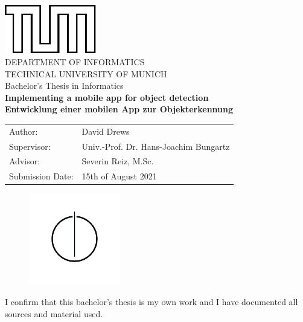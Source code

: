 \documentclass[11pt,
               a4paper,
               bibtotoc,
               idxtotoc,
               headsepline,
               footsepline,
               footexclude,
               BCOR12mm,
               DIV13,
               openany,   %
               ]
               {scrbook}
\def\doctype{Bachelor's Thesis\xspace}
\def\studyProgram{Informatics}
\def\title{Implementing a mobile app for object detection}
\def\titleGer{Entwicklung einer mobilen App zur Objekterkennung}
\def\author{David Drews}
\def\supervisor{Univ.-Prof. Dr. Hans-Joachim Bungartz}
\def\advisor{Severin Reiz, M.Sc.}
\def\date{15th of August 2021}
\begin{document}
\def\bcorcor{0.15cm}
\addtolength{\hoffset}{\bcorcor}
\thispagestyle{empty}
\vspace{10mm}
\begin{center}
    \includegraphics[width=4cm]{templateStuff/tumlogo.pdf}\\[5mm]
	\huge DEPARTMENT OF INFORMATICS\\[5mm]
	\large TECHNICAL UNIVERSITY OF MUNICH\\[24mm]
	{\Large \doctype in \studyProgram}\\[20mm]
	{\LARGE\bf \title}\\[10mm]
	{\LARGE\bf \titleGer}\\[10mm]
	\begin{tabular}{ll}
		\Large Author:      	& \Large \author \\[2mm]
		\Large Supervisor:  	& \Large \supervisor\\[2mm]
		\Large Advisor:			& \Large \advisor\\[2mm]
		\Large Submission Date:       		& \Large \date
	\end{tabular}
	\vspace{-1mm}
	\begin{figure}[h!]
		\centering
		\includegraphics[width=4cm]{templateStuff/informat.pdf}
	\end{figure}
\end{center}

\addtolength{\hoffset}{\bcorcor}
\newpage


\cleardoubleemptypage

\thispagestyle{empty}
\vspace*{0.7\textheight}
\noindent
I confirm that this \MakeLowercase{\doctype} is my own work and I have documented all sources and material used.\\
\end{document}
